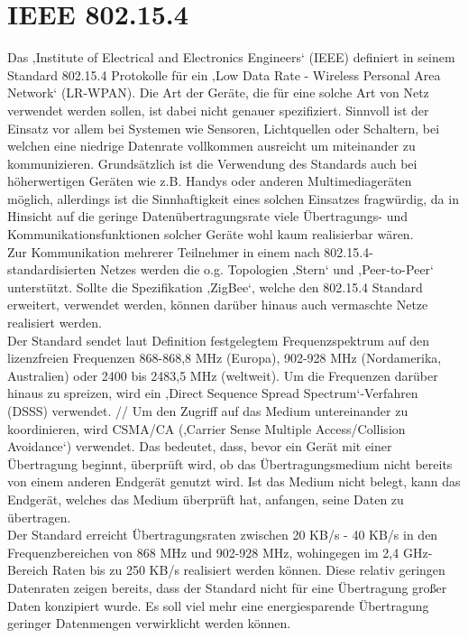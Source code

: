 \section{IEEE 802.15.4}\label{ss:IEEE802154}

Das ‚Institute of Electrical and Electronics Engineers‘ (IEEE) definiert in seinem Standard 802.15.4 Protokolle für ein ‚Low Data Rate - Wireless Personal Area Network‘ (LR-WPAN). Die Art der Geräte, die für eine solche Art von Netz verwendet werden sollen, ist dabei nicht genauer spezifiziert. Sinnvoll ist der Einsatz vor allem bei Systemen wie Sensoren, Lichtquellen oder Schaltern, bei welchen eine niedrige Datenrate vollkommen ausreicht um miteinander zu kommunizieren. Grundsätzlich ist die Verwendung des Standards auch bei höherwertigen Geräten wie z.B. Handys oder anderen Multimediageräten möglich, allerdings ist die Sinnhaftigkeit eines solchen Einsatzes fragwürdig, da in Hinsicht auf die geringe Datenübertragungsrate viele Übertragungs- und Kommunikationsfunktionen solcher Geräte wohl kaum realisierbar wären. \\
Zur Kommunikation mehrerer Teilnehmer in einem nach 802.15.4-standardisierten Netzes werden die o.g. Topologien ‚Stern‘ und ‚Peer-to-Peer‘ unterstützt. Sollte die Spezifikation ‚ZigBee‘,  welche den 802.15.4 Standard erweitert, verwendet werden, können darüber hinaus auch vermaschte Netze realisiert werden. \\
Der Standard sendet laut Definition festgelegtem Frequenzspektrum auf den lizenzfreien Frequenzen 868-868,8 MHz (Europa), 902-928 MHz (Nordamerika, Australien) oder 2400 bis 2483,5 MHz (weltweit). Um die Frequenzen darüber hinaus zu spreizen, wird ein ‚Direct Sequence Spread Spectrum‘-Verfahren (DSSS) verwendet. //
Um den Zugriff auf das Medium untereinander zu koordinieren, wird CSMA/CA (‚Carrier Sense Multiple Access/Collision Avoidance‘) verwendet. Das bedeutet, dass, bevor ein Gerät mit einer Übertragung beginnt, überprüft wird, ob das Übertragungsmedium nicht bereits von einem anderen Endgerät genutzt wird. Ist das Medium nicht belegt, kann das Endgerät, welches das Medium überprüft hat, anfangen, seine Daten zu übertragen.\\
Der Standard erreicht Übertragungsraten zwischen 20 KB/s - 40 KB/s in den Frequenzbereichen von 868 MHz und 902-928 MHz, wohingegen im 2,4 GHz-Bereich Raten bis zu 250 KB/s realisiert werden können. Diese relativ geringen Datenraten zeigen bereits, dass der Standard nicht für eine Übertragung großer Daten konzipiert wurde. Es soll viel mehr eine energiesparende Übertragung geringer Datenmengen verwirklicht werden können.

